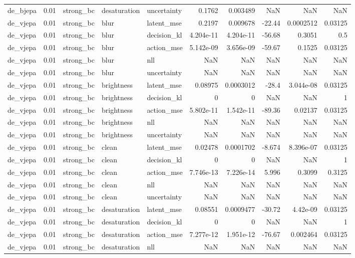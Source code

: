 \begin{tabular}{lrlllrrrrr}
de\_bjepa & 0.01 & strong\_bc & desaturation & uncertainty & 0.1762 & 0.003489 & NaN & NaN & NaN \\
de\_vjepa & 0.01 & strong\_bc & blur & latent\_mse & 0.2197 & 0.009678 & -22.44 & 0.0002512 & 0.03125 \\
de\_vjepa & 0.01 & strong\_bc & blur & decision\_kl & 4.204e-11 & 4.204e-11 & -56.68 & 0.3051 & 0.5 \\
de\_vjepa & 0.01 & strong\_bc & blur & action\_mse & 5.142e-09 & 3.656e-09 & -59.67 & 0.1525 & 0.03125 \\
de\_vjepa & 0.01 & strong\_bc & blur & nll & NaN & NaN & NaN & NaN & NaN \\
de\_vjepa & 0.01 & strong\_bc & blur & uncertainty & NaN & NaN & NaN & NaN & NaN \\
de\_vjepa & 0.01 & strong\_bc & brightness & latent\_mse & 0.08975 & 0.0003012 & -28.4 & 3.044e-08 & 0.03125 \\
de\_vjepa & 0.01 & strong\_bc & brightness & decision\_kl & 0 & 0 & NaN & NaN & 1 \\
de\_vjepa & 0.01 & strong\_bc & brightness & action\_mse & 5.802e-11 & 1.542e-11 & -89.36 & 0.02137 & 0.03125 \\
de\_vjepa & 0.01 & strong\_bc & brightness & nll & NaN & NaN & NaN & NaN & NaN \\
de\_vjepa & 0.01 & strong\_bc & brightness & uncertainty & NaN & NaN & NaN & NaN & NaN \\
de\_vjepa & 0.01 & strong\_bc & clean & latent\_mse & 0.02478 & 0.0001702 & -8.674 & 8.396e-07 & 0.03125 \\
de\_vjepa & 0.01 & strong\_bc & clean & decision\_kl & 0 & 0 & NaN & NaN & 1 \\
de\_vjepa & 0.01 & strong\_bc & clean & action\_mse & 7.746e-13 & 7.226e-14 & 5.996 & 0.3099 & 0.3125 \\
de\_vjepa & 0.01 & strong\_bc & clean & nll & NaN & NaN & NaN & NaN & NaN \\
de\_vjepa & 0.01 & strong\_bc & clean & uncertainty & NaN & NaN & NaN & NaN & NaN \\
de\_vjepa & 0.01 & strong\_bc & desaturation & latent\_mse & 0.08551 & 0.0009477 & -30.72 & 4.42e-09 & 0.03125 \\
de\_vjepa & 0.01 & strong\_bc & desaturation & decision\_kl & 0 & 0 & NaN & NaN & 1 \\
de\_vjepa & 0.01 & strong\_bc & desaturation & action\_mse & 7.277e-12 & 1.951e-12 & -76.67 & 0.002464 & 0.03125 \\
de\_vjepa & 0.01 & strong\_bc & desaturation & nll & NaN & NaN & NaN & NaN & NaN \\

\end{tabular}
